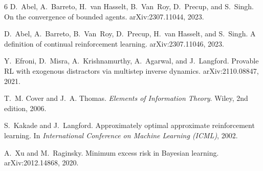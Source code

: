 \documentclass[11pt]{article}
\theoremstyle{definition}
\begin{document}
\begin{thebibliography}{6}
D.~Abel, A.~Barreto, H.~van Hasselt, B.~Van~Roy, D.~Precup, and S.~Singh.
\newblock On the convergence of bounded agents.
\newblock arXiv:2307.11044, 2023.

D.~Abel, A.~Barreto, B.~Van~Roy, D.~Precup, H.~van Hasselt, and S.~Singh.
\newblock A definition of continual reinforcement learning.
\newblock arXiv:2307.11046, 2023.

Y.~Efroni, D.~Misra, A.~Krishnamurthy, A.~Agarwal, and J.~Langford.
\newblock Provable RL with exogenous distractors via multistep inverse dynamics.
\newblock arXiv:2110.08847, 2021.

T.~M. Cover and J.~A. Thomas.
\newblock \emph{Elements of Information Theory}.
\newblock Wiley, 2nd edition, 2006.

S.~Kakade and J.~Langford.
\newblock Approximately optimal approximate reinforcement learning.
\newblock In \emph{International Conference on Machine Learning (ICML)}, 2002.

A.~Xu and M.~Raginsky.
\newblock Minimum excess risk in Bayesian learning.
\newblock arXiv:2012.14868, 2020.
\end{thebibliography}
\end{document}
